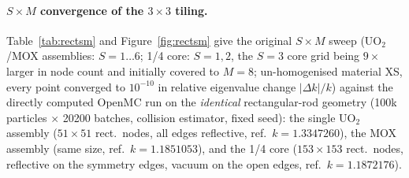 \documentclass[11pt,a4paper]{article}
\begin{document}
\paragraph{$S\times M$ convergence of the $3\times3$ tiling.}
Table~\ref{tab:rectsm} and Figure~\ref{fig:rectsm} give the original
$S\times M$ sweep (UO$_2$/MOX assemblies: $S{=}1\ldots6$; 1/4 core:
$S{=}1,2$, the $S{=}3$ core grid being $9\times$ larger in node count and
initially covered to $M{=}8$; un-homogenised material XS, every point
converged to $10^{-10}$ in relative eigenvalue change
$|\Delta k|/k$) against the directly computed OpenMC run
on the \emph{identical} rectangular-rod geometry
(100k particles $\times$ 20200 batches, collision estimator, fixed seed):
the single UO$_2$ assembly ($51\times51$ rect.\ nodes, all edges
reflective, ref.\ $k=1.3347260$), the MOX assembly (same size, ref.\
$k=1.1851053$), and the 1/4 core ($153\times153$ rect.\ nodes, reflective
on the symmetry edges, vacuum on the open edges, ref.\ $k=1.1872176$).
\end{document}
